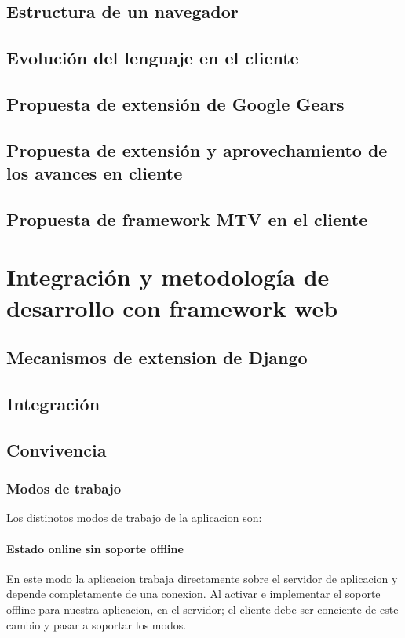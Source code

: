 \documentclass[a4paper]{report}
\begin{document}
\section{Estructura de un navegador}
\section{Evolución del lenguaje en el cliente}
\section{Propuesta de extensión de Google Gears}
\section{Propuesta de extensión y aprovechamiento de los avances en cliente}

\section{Propuesta de framework MTV en el cliente}


\chapter{Integración y metodología de desarrollo con framework web}
\section{Mecanismos de extension de Django}
\section{Integración}
\section{Convivencia}

\subsection{Modos de trabajo}
Los distinotos modos de trabajo de la aplicacion son:
\subsubsection{Estado online sin soporte offline}
En este modo la aplicacion trabaja directamente sobre el servidor de aplicacion y depende completamente de una conexion.
Al activar e implementar el soporte offline para nuestra aplicacion, en el servidor; el cliente debe ser conciente de este cambio y pasar a soportar los modos.
\end{document}
